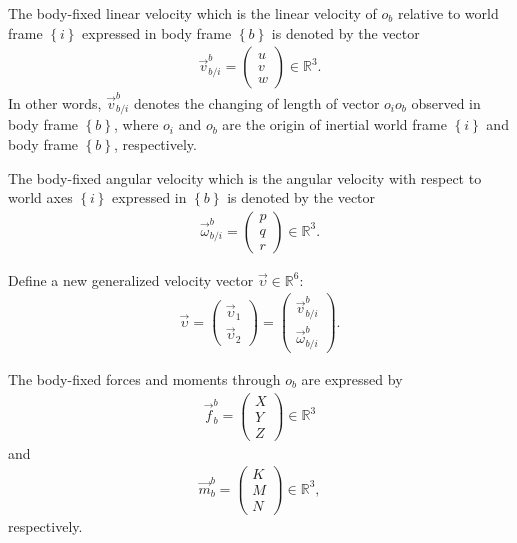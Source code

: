 The body-fixed linear velocity which is the linear velocity of $o_{b}$ relative to world frame $\left\{ i \right\}$ expressed in body frame $\left\{ b \right\}$ is denoted by the vector 
\begin{align}
\vec{v}^{b}_{b/i}=
\begin{pmatrix}
u\\v\\w
\end{pmatrix}
\in
\mathbb{R}^{3}.
\end{align}
In other words, $\vec{v}^{b}_{b/i}$ denotes the changing of length of vector $o_{i}o_{b}$ observed in body frame $\left\{ b \right\}$, where $o_{i}$ and $o_{b}$ are the origin of inertial world frame $\left\{ i \right\}$ and body frame $\left\{ b \right\}$, respectively.   

The body-fixed angular velocity which is the angular velocity with respect to world axes $\left\{ i \right\}$ expressed in $\left\{ b \right\}$ is denoted by the vector
\begin{align}
\vec{\omega}^{b}_{b/i}=
\begin{pmatrix}
p\\q\\r
\end{pmatrix}
\in
\mathbb{R}^{3}.
\end{align}

Define a new generalized velocity vector $\vec{\upsilon}\in \mathbb{R}^{6}$: 
\begin{align}
\vec{\upsilon}=
\begin{pmatrix}
\vec{\upsilon}_{1}\\
\vec{\upsilon}_{2}
\end{pmatrix}
=\begin{pmatrix}
\vec{v}^{b}_{b/i} \\
\vec{\omega}^{b}_{b/i}
\end{pmatrix}.
\end{align}

The body-fixed forces and moments through $o_{b}$
are expressed by 
\begin{align}
\vec{f}^{b}_{b}=
\begin{pmatrix}
X\\Y\\Z
\end{pmatrix}
\in
\mathbb{R}^{3}
\end{align}
and
\begin{align}
\vec{m}^{b}_{b}=
\begin{pmatrix}
K\\M\\N
\end{pmatrix}
\in
\mathbb{R}^{3},
\end{align}
respectively.

